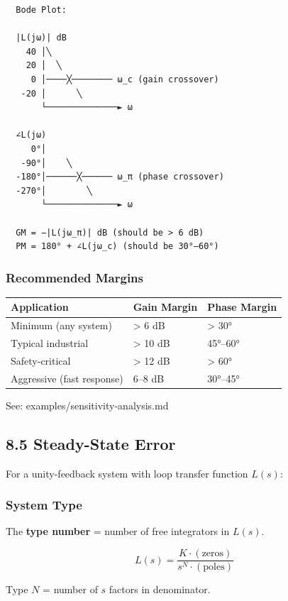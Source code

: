 \documentclass[11pt,a4paper]{book}
\begin{document}
\begin{lstlisting}
  Bode Plot:
  
  |L(jω)| dB
    40 │╲
    20 │  ╲
     0 │────╳──────── ω_c (gain crossover)
   -20 │      ╲
       └──────────────► ω
       
  ∠L(jω)
     0°│
   -90°│    ╲
  -180°│──────╳────── ω_π (phase crossover)
  -270°│        ╲
       └──────────────► ω
       
  GM = −|L(jω_π)| dB (should be > 6 dB)
  PM = 180° + ∠L(jω_c) (should be 30°–60°)
\end{lstlisting}

\subsubsection{Recommended Margins}

\begin{center}
\begin{tabular}{|l|l|l|}
\hline
Application & Gain Margin & Phase Margin \\
\hline
Minimum (any system) & > 6 dB & > 30° \\
Typical industrial & > 10 dB & 45°–60° \\
Safety-critical & > 12 dB & > 60° \\
Aggressive (fast response) & 6–8 dB & 30°–45° \\
\hline
\end{tabular}
\end{center}

See: examples/sensitivity-analysis.md

\medskip\noindent\hrulefill\medskip

\subsection{8.5 Steady-State Error}

For a unity-feedback system with loop transfer function $L(s)$:

\subsubsection{System Type}

The \textbf{type number} = number of free integrators in $L(s)$.

\[L(s) = \frac{K \cdot (\text{zeros})}{s^N \cdot (\text{poles})}\]

Type $N$ = number of $s$ factors in denominator.
\end{document}
